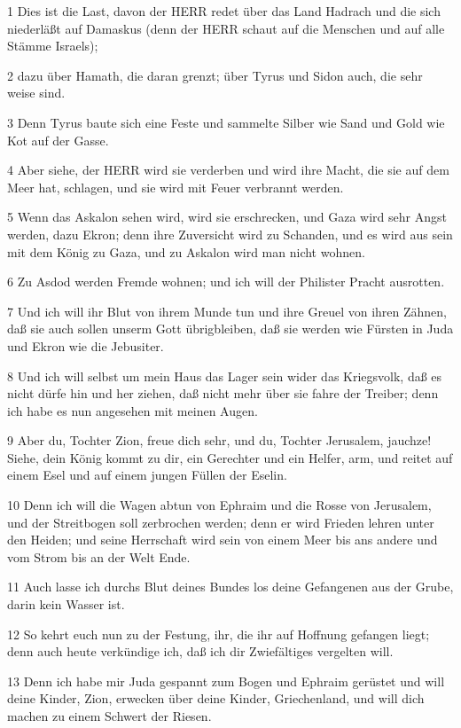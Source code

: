 \par 1 Dies ist die Last, davon der HERR redet über das Land Hadrach und die sich niederläßt auf Damaskus (denn der HERR schaut auf die Menschen und auf alle Stämme Israels);
\par 2 dazu über Hamath, die daran grenzt; über Tyrus und Sidon auch, die sehr weise sind.
\par 3 Denn Tyrus baute sich eine Feste und sammelte Silber wie Sand und Gold wie Kot auf der Gasse.
\par 4 Aber siehe, der HERR wird sie verderben und wird ihre Macht, die sie auf dem Meer hat, schlagen, und sie wird mit Feuer verbrannt werden.
\par 5 Wenn das Askalon sehen wird, wird sie erschrecken, und Gaza wird sehr Angst werden, dazu Ekron; denn ihre Zuversicht wird zu Schanden, und es wird aus sein mit dem König zu Gaza, und zu Askalon wird man nicht wohnen.
\par 6 Zu Asdod werden Fremde wohnen; und ich will der Philister Pracht ausrotten.
\par 7 Und ich will ihr Blut von ihrem Munde tun und ihre Greuel von ihren Zähnen, daß sie auch sollen unserm Gott übrigbleiben, daß sie werden wie Fürsten in Juda und Ekron wie die Jebusiter.
\par 8 Und ich will selbst um mein Haus das Lager sein wider das Kriegsvolk, daß es nicht dürfe hin und her ziehen, daß nicht mehr über sie fahre der Treiber; denn ich habe es nun angesehen mit meinen Augen.
\par 9 Aber du, Tochter Zion, freue dich sehr, und du, Tochter Jerusalem, jauchze! Siehe, dein König kommt zu dir, ein Gerechter und ein Helfer, arm, und reitet auf einem Esel und auf einem jungen Füllen der Eselin.
\par 10 Denn ich will die Wagen abtun von Ephraim und die Rosse von Jerusalem, und der Streitbogen soll zerbrochen werden; denn er wird Frieden lehren unter den Heiden; und seine Herrschaft wird sein von einem Meer bis ans andere und vom Strom bis an der Welt Ende.
\par 11 Auch lasse ich durchs Blut deines Bundes los deine Gefangenen aus der Grube, darin kein Wasser ist.
\par 12 So kehrt euch nun zu der Festung, ihr, die ihr auf Hoffnung gefangen liegt; denn auch heute verkündige ich, daß ich dir Zwiefältiges vergelten will.
\par 13 Denn ich habe mir Juda gespannt zum Bogen und Ephraim gerüstet und will deine Kinder, Zion, erwecken über deine Kinder, Griechenland, und will dich machen zu einem Schwert der Riesen.
